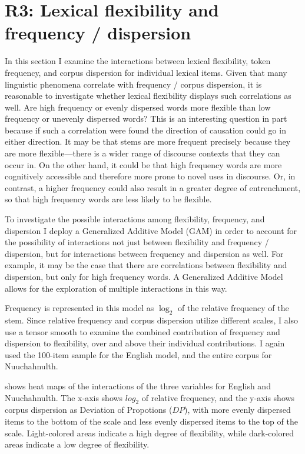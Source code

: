 \section{R3: Lexical flexibility and frequency / dispersion}
\label{sec:4.5}

In this section I examine the interactions between lexical flexibility, token frequency, and corpus dispersion for individual lexical items. Given that many linguistic phenomena correlate with frequency / corpus dispersion, it is reasonable to investigate whether lexical flexibility displays such correlations as well. Are high frequency or evenly dispersed words more flexible than low frequency or unevenly dispersed words? This is an interesting question in part because if such a correlation were found the direction of causation could go in either direction. It may be that stems are more frequent precisely because they are more flexible—there is a wider range of discourse contexts that they can occur in. On the other hand, it could be that high frequency words are more cognitively accessible and therefore more prone to novel uses in discourse. Or, in contrast, a higher frequency could also result in a greater degree of entrenchment, so that high frequency words are less likely to be flexible.

To investigate the possible interactions among flexibility, frequency, and dispersion I deploy a Generalized Additive Model (GAM) in order to account for the possibility of interactions not just between flexibility and frequency / dispersion, but for interactions between frequency and dispersion as well. For example, it may be the case that there are correlations between flexibility and dispersion, but only for high frequency words. A Generalized Additive Model allows for the exploration of multiple interactions in this way.

Frequency is represented in this model as $\log_2$ of the relative frequency of the stem. Since relative frequency and corpus dispersion utilize different scales, I also use a tensor smooth to examine the combined contribution of frequency and dispersion to flexibility, over and above their individual contributions. I again used the 100-item sample for the English model, and the entire corpus for Nuuchahnulth.

 shows heat maps of the interactions of the three variables for English and Nuuchahnulth. The x-axis shows $log_2$ of relative frequency, and the y-axis shows corpus dispersion as Deviation of Propotions ($DP$), with more evenly dispersed items to the bottom of the scale and less evenly dispersed items to the top of the scale. Light-colored areas indicate a high degree of flexibility, while dark-colored areas indicate a low degree of flexibility.

